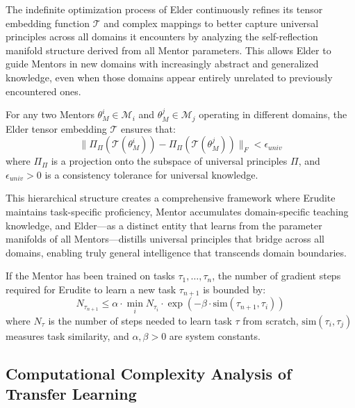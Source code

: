 The indefinite optimization process of Elder continuously refines its tensor embedding function $\mathcal{T}$ and complex mappings to better capture universal principles across all domains it encounters by analyzing the self-reflection manifold structure derived from all Mentor parameters. This allows Elder to guide Mentors in new domains with increasingly abstract and generalized knowledge, even when those domains appear entirely unrelated to previously encountered ones.

\begin{theorem}
For any two Mentors $\theta_M^i \in \mathcal{M}_i$ and $\theta_M^j \in \mathcal{M}_j$ operating in different domains, the Elder tensor embedding $\mathcal{T}$ ensures that:
\begin{equation}
\| \Pi_{\Pi}(\mathcal{T}(\theta_M^i)) - \Pi_{\Pi}(\mathcal{T}(\theta_M^j)) \|_F < \epsilon_{univ}
\end{equation}
where $\Pi_{\Pi}$ is a projection onto the subspace of universal principles $\Pi$, and $\epsilon_{univ} > 0$ is a consistency tolerance for universal knowledge.
\end{theorem}

This hierarchical structure creates a comprehensive framework where Erudite maintains task-specific proficiency, Mentor accumulates domain-specific teaching knowledge, and Elder—as a distinct entity that learns from the parameter manifolds of all Mentors—distills universal principles that bridge across all domains, enabling truly general intelligence that transcends domain boundaries.

\begin{theorem}
If the Mentor has been trained on tasks $\tau_1, \ldots, \tau_n$, the number of gradient steps required for Erudite to learn a new task $\tau_{n+1}$ is bounded by:
\begin{equation}
N_{\tau_{n+1}} \leq \alpha \cdot \min_i N_{\tau_i} \cdot \exp\left(-\beta \cdot \mathrm{sim}(\tau_{n+1}, \tau_i)\right)
\end{equation}
where $N_{\tau}$ is the number of steps needed to learn task $\tau$ from scratch, $\mathrm{sim}(\tau_i, \tau_j)$ measures task similarity, and $\alpha, \beta > 0$ are system constants.
\end{theorem}

\subsection{Computational Complexity Analysis of Transfer Learning}


